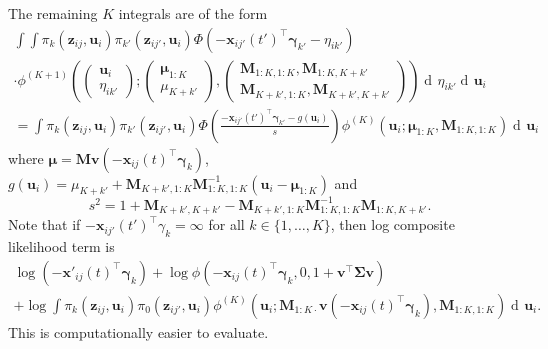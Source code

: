 \documentclass{article}
\newcommand\mat[1]{\mathbf{#1}}
\renewcommand\vec{\bm}
\newcommand\der{\operatorname{d\!}{}}
\begin{document}
%
The remaining $K$ integrals are of the form %
%
\begin{multline*}
\int\int \pi_k(\vec z_{ij},\vec u_i)
  \pi_{k'}(\vec z_{ij'},\vec u_i)\Phi(-\vec x_{ij'}(t')^\top\vec\gamma_{k'} - \eta_{ik'}) \\
\cdot 
  \phi^{(K + 1)}\left(
    \begin{pmatrix}\vec u_i \\ \eta_{ik'} \end{pmatrix}; 
    \begin{pmatrix}\vec\mu_{1:K} \\ \mu_{K + k'} \end{pmatrix},
    \begin{pmatrix}
      \mat M_{1:K, 1:K}, \mat M_{1:K, K + k'} \\
      \mat M_{K + k', 1:K}, \mat M_{K + k', K + k'}
    \end{pmatrix}
    \right)\der\eta_{ik'}\der\vec u_i \\
 = \int \pi_k(\vec z_{ij},\vec u_i)
  \pi_{k'}(\vec z_{ij'},\vec u_i)
  \Phi\left(
    \frac{-\vec x_{ij'}(t')^\top\vec\gamma_{k'} - g(\vec u_i)}
         {s}
    \right)\phi^{(K)}\left(
    \vec u_i; 
    \vec\mu_{1:K},
    \mat M_{1:K, 1:K}
    \right)\der\vec u_i
\end{multline*}%
%
where $\vec\mu = \mat M\vec v(-\vec x_{ij}(t)^\top\vec\gamma_k)$,
$g(\vec u_i) = \mu_{K + k'} + 
    \mat M_{K + k', 1:K}\mat M_{1:K, 1:K}^{-1}(\vec u_i - \vec\mu_{1:K})$ and%
$$
s^2 = 1 + \mat M_{K + k', K + k'} 
  - \mat M_{K + k',1:K}\allowbreak\mat M_{1:K, 1:K}^{-1}\allowbreak\mat M_{1:K,K + k'}.
$$%
%
Note that if $-\vec x_{ij'}(t')^\top\gamma_k = \infty$ for all $k\in\{1,\dots,K\}$, 
then log composite likelihood term is %
%
\begin{multline*}
\log(-\vec x'_{ij}(t)^\top\vec\gamma_k)  
  + \log \phi\left(
    -\vec x_{ij}(t)^\top\vec\gamma_k, 0, 1 + \vec v^\top\mat\Sigma\vec v\right) \\
+ \log \int 
  \pi_k(\vec z_{ij},\vec u_i)
  \pi_0(\vec z_{ij'},\vec u_i)
  \phi^{(K)}\left(
    \vec u_i; 
    \mat M_{1:K\cdot}\vec v(-\vec x_{ij}(t)^\top\vec\gamma_k),
    \mat M_{1:K,1:K}
    \right)
  \der \vec u_i.
\end{multline*}%
%
This is computationally easier to evaluate. 
\end{document}
